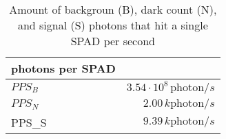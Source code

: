 \begin{table}[H]
\centering
\caption{Amount of backgroun (B), dark count (N), and signal (S) photons that hit a single SPAD per second}
\label{tab:photons_per_SPAD}
\begin{tabular}{|l|r|}\hline
    \textbf{photons per SPAD} & \\
    \hline 
    $PPS_B$ & $3.54\cdot10^{8}\,\text{photon}/s$ \\
    $PPS_N$ & $2.00\,k \text{photon}/s$ \\
    PPS_S & $9.39\,k \text{photon}/s$ \\
    \hline 
\end{tabular}
\end{table}
